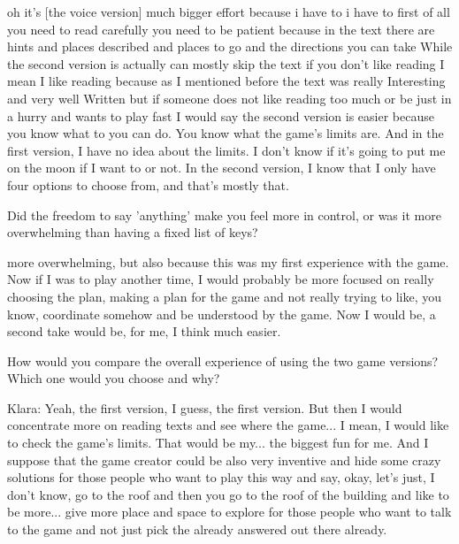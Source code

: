 \begin{QandA}
         \begin{answered}
            oh it's [the voice version] much bigger effort because i have to i have to first of all you need to read carefully you need to be patient because in the text there are hints and places described and places to go and the directions you can take
            While the second version is actually can mostly skip the text if you don't like reading I mean I like reading because as I mentioned before the text was really Interesting and very well Written but if someone does not like reading too much or be just in a hurry and wants to play fast I would say the second version is easier because you know what to
            you can do.
            You know what the game's limits are.
            And in the first version, I have no idea about the limits.
            I don't know if it's going to put me on the moon if I want to or not.
            In the second version, I know that I only have four options to choose from, and that's mostly that.
         \end{answered}

    \item Did the freedom to say 'anything' make you feel more in control, or was it more overwhelming than having a fixed list of keys?

         \begin{answered}
            more overwhelming, but also because this was my first experience with the game.
            Now if I was to play another time, I would probably be more focused on really choosing the plan, making a plan for the game and not really trying to like, you know, coordinate somehow and be understood by the game.
            Now I would be, a second take would be, for me, I think much easier.
         \end{answered}
    \item How would you compare the overall experience of using the two game versions? Which one would you choose and why?

         \begin{answered}
            Klara: Yeah, the first version, I guess, the first version.
            But then I would concentrate more on reading texts and see where the game...
            I mean, I would like to check the game's limits.
            That would be my... the biggest fun for me.
            And I suppose that the game creator could be also very inventive and hide some crazy solutions for those people who want to play this way and say, okay, let's just, I don't know, go to the roof and then you go to the roof of the building and like to be more...
            give more place and space to explore for those people who want to talk to the game and not just pick the already answered out there already.



\end{answered}
\end{QandA}
